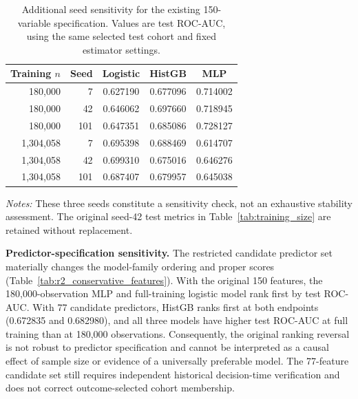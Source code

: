 \documentclass[10pt]{article}
\begin{document}
\begin{table}[!ht]
\centering
\caption{Additional seed sensitivity for the existing 150-variable specification. Values are test ROC-AUC, using the same selected test cohort and fixed estimator settings.}
\label{tab:r2_seed_sensitivity}
\begin{tabular}{rrccc}
\toprule
Training $n$ & Seed & Logistic & HistGB & MLP \\
\midrule
180,000 & 7 & 0.627190 & 0.677096 & 0.714002 \\
180,000 & 42 & 0.646062 & 0.697660 & 0.718945 \\
180,000 & 101 & 0.647351 & 0.685086 & 0.728127 \\
\midrule
1,304,058 & 7 & 0.695398 & 0.688469 & 0.614707 \\
1,304,058 & 42 & 0.699310 & 0.675016 & 0.646276 \\
1,304,058 & 101 & 0.687407 & 0.679957 & 0.645038 \\
\bottomrule
\end{tabular}
\vspace{2pt}
{\footnotesize \textit{Notes:} These three seeds constitute a sensitivity check, not an exhaustive stability assessment. The original seed-42 test metrics in Table~\ref{tab:training_size} are retained without replacement.}
\end{table}

\noindent\textbf{Predictor-specification sensitivity.} The restricted candidate predictor set materially changes the model-family ordering and proper scores (Table~\ref{tab:r2_conservative_features}). With the original 150 features, the 180,000-observation MLP and full-training logistic model rank first by test ROC-AUC. With 77 candidate predictors, HistGB ranks first at both endpoints (0.672835 and 0.682980), and all three models have higher test ROC-AUC at full training than at 180,000 observations. Consequently, the original ranking reversal is not robust to predictor specification and cannot be interpreted as a causal effect of sample size or evidence of a universally preferable model. The 77-feature candidate set still requires independent historical decision-time verification and does not correct outcome-selected cohort membership.
\end{document}
